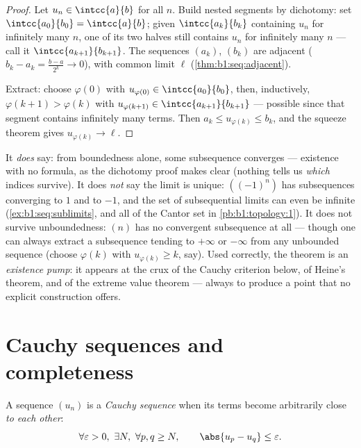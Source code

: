 \begin{proof}
Let $u_n \in \intcc{a}{b}$ for all $n$. Build nested segments by
dichotomy: set $\intcc{a_0}{b_0} = \intcc{a}{b}$; given
$\intcc{a_k}{b_k}$ containing $u_n$ for infinitely many $n$, one of
its two halves still contains $u_n$ for infinitely many $n$ --- call
it $\intcc{a_{k+1}}{b_{k+1}}$. The sequences $(a_k)$, $(b_k)$ are
adjacent ($b_k - a_k = \frac{b-a}{2^k} \to 0$), with common limit
$\ell$ (\cref{thm:b1:seq:adjacent}).

Extract: choose $\varphi(0)$ with $u_{\varphi(0)} \in
\intcc{a_0}{b_0}$, then, inductively, $\varphi(k+1) > \varphi(k)$
with $u_{\varphi(k+1)} \in \intcc{a_{k+1}}{b_{k+1}}$ --- possible
since that segment contains infinitely many terms. Then $a_k \leq
u_{\varphi(k)} \leq b_k$, and the squeeze theorem gives
$u_{\varphi(k)} \to \ell$.
\end{proof}

\begin{remark}
It \emph{does} say: from boundedness alone, some subsequence
converges --- existence with no formula, as the dichotomy proof
makes clear (nothing tells us \emph{which} indices survive). It
does \emph{not} say the limit is unique: $((-1)^n)$ has
subsequences converging to $1$ and to $-1$, and the set of
subsequential limits can even be infinite
(\cref{ex:b1:seq:sublimits}, and all of the Cantor set in
\cref{pb:b1:topology:1}). It does not survive unboundedness:
$(n)$ has no convergent subsequence at all --- though one can
always extract a subsequence tending to $+\infty$ or $-\infty$
from any unbounded sequence (choose $\varphi(k)$ with
$u_{\varphi(k)} \geq k$, say). Used correctly, the theorem is an
\emph{existence pump}: it appears at the crux of the Cauchy
criterion below, of Heine's theorem, and of the extreme value
theorem --- always to produce a point that no explicit
construction offers.
\end{remark}

\section{Cauchy sequences and completeness}

\begin{definition}\label{def:b1:seq:cauchy}
A sequence $(u_n)$ is a \emph{Cauchy sequence}
when its terms become arbitrarily close \emph{to each other}:
\[
\forall \varepsilon > 0,\ \exists N,\ \forall p, q \geq N,
\qquad \abs{u_p - u_q} \leq \varepsilon .
\]
\end{definition}

